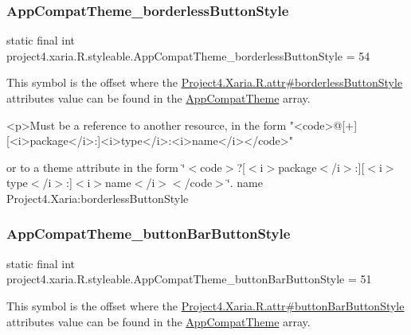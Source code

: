 \subsubsection{\texorpdfstring{App\+Compat\+Theme\+\_\+borderless\+Button\+Style}{AppCompatTheme\_borderlessButtonStyle}}
{\footnotesize\ttfamily static final int project4.\+xaria.\+R.\+styleable.\+App\+Compat\+Theme\+\_\+borderless\+Button\+Style = 54\hspace{0.3cm}{\ttfamily [static]}}

This symbol is the offset where the \hyperlink{}{Project4.\+Xaria.\+R.\+attr\#borderless\+Button\+Style} attribute\textquotesingle{}s value can be found in the \hyperlink{classproject4_1_1xaria_1_1R_1_1styleable_aad8bec413e2350f9404e6ff0e831a85d}{App\+Compat\+Theme} array.

\begin{DoxyVerb}      <p>Must be a reference to another resource, in the form "<code>@[+][<i>package</i>:]<i>type</i>:<i>name</i></code>"
\end{DoxyVerb}
 or to a theme attribute in the form \char`\"{}$<$code$>$?\mbox{[}$<$i$>$package$<$/i$>$\+:\mbox{]}\mbox{[}$<$i$>$type$<$/i$>$\+:\mbox{]}$<$i$>$name$<$/i$>$$<$/code$>$\char`\"{}.  name Project4.\+Xaria\+:borderless\+Button\+Style \mbox{\label{classproject4_1_1xaria_1_1R_1_1styleable_ae2759e35f58ee9b12ec64393bc516a42}} 
\subsubsection{\texorpdfstring{App\+Compat\+Theme\+\_\+button\+Bar\+Button\+Style}{AppCompatTheme\_buttonBarButtonStyle}}
{\footnotesize\ttfamily static final int project4.\+xaria.\+R.\+styleable.\+App\+Compat\+Theme\+\_\+button\+Bar\+Button\+Style = 51\hspace{0.3cm}{\ttfamily [static]}}

This symbol is the offset where the \hyperlink{}{Project4.\+Xaria.\+R.\+attr\#button\+Bar\+Button\+Style} attribute\textquotesingle{}s value can be found in the \hyperlink{classproject4_1_1xaria_1_1R_1_1styleable_aad8bec413e2350f9404e6ff0e831a85d}{App\+Compat\+Theme} array.

